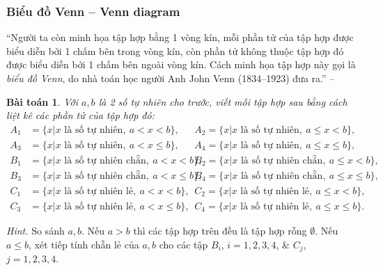 \documentclass{article}
\numberwithin{equation}{section}
\newtheorem{baitoan}{Bài toán}[section]
\begin{document}
\subsubsection{Biểu đồ Venn -- Venn diagram}
``Người ta còn minh họa tập hợp bằng 1 vòng kín, mỗi phần tử của tập hợp được biểu diễn bởi 1 chấm bên trong vòng kín, còn phần tử không thuộc tập hợp đó được biểu diễn bởi 1 chấm bên ngoài vòng kín. Cách minh họa tập hợp này gọi là \textit{biểu đồ Venn}, do nhà toán học người Anh John Venn (1834--1923) đưa ra.'' -- \cite[p. 8]{SGK_Toan_6_Canh_Dieu_tap_1}

\begin{baitoan}
	Với $a,b$ là 2 số tự nhiên cho trước, viết mỗi tập hợp sau bằng cách liệt kê các phần tử của tập hợp đó:
	\begin{align*}
		A_1 &= \{x|x\mbox{ là số tự nhiên},\ a < x < b\},\ &&A_2 = \{x|x\mbox{ là số tự nhiên},\ a\le x < b\},\\
		A_3 &= \{x|x\mbox{ là số tự nhiên},\ a < x\le b\},\ &&A_4 = \{x|x\mbox{ là số tự nhiên},\ a\le x\le b\},\\
		B_1 &= \{x|x\mbox{ là số tự nhiên chẵn},\ a < x < b\},\ &&B_2 = \{x|x\mbox{ là số tự nhiên chẵn},\ a\le x < b\},\\
		B_3 &= \{x|x\mbox{ là số tự nhiên chẵn},\ a < x\le b\},\ &&B_4 = \{x|x\mbox{ là số tự nhiên chẵn},\ a\le x\le b\},\\
		C_1 &= \{x|x\mbox{ là số tự nhiên lẻ},\ a < x < b\},\ &&C_2 = \{x|x\mbox{ là số tự nhiên lẻ},\ a\le x < b\},\\ C_3 &= \{x|x\mbox{ là số tự nhiên lẻ},\ a < x\le b\},\ &&C_4 = \{x|x\mbox{ là số tự nhiên lẻ},\ a\le x\le b\}.
	\end{align*}
\end{baitoan}
\textit{Hint.} So sánh $a,b$. Nếu $a > b$ thì các tập hợp trên đều là tập hợp rỗng $\emptyset$. Nếu $a\le b$, xét tiếp tính chẵn lẻ của $a,b$ cho các tập $B_i$, $i = 1,2,3,4$, \& $C_j$, $j = 1,2,3,4$.
\end{document}
